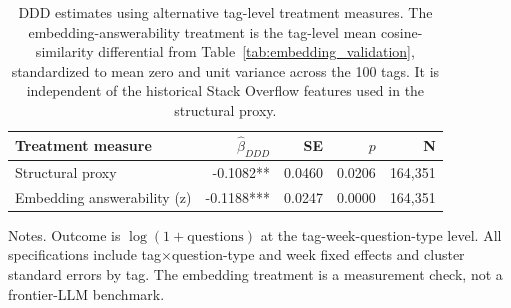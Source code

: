 \begin{table}[ht]
\centering
\caption{DDD estimates using alternative tag-level treatment measures. The embedding-answerability treatment is the tag-level mean cosine-similarity differential from Table~\ref{tab:embedding_validation}, standardized to mean zero and unit variance across the 100 tags. It is independent of the historical Stack Overflow features used in the structural proxy.}
\label{tab:embedding_answerability_treatment}
\small
\begin{tabular}{lrrrr}
\toprule
Treatment measure & $\hat\beta_{DDD}$ & SE & $p$ & N \\
\midrule
Structural proxy & -0.1082** & 0.0460 & 0.0206 & 164,351 \\
Embedding answerability (z) & -0.1188*** & 0.0247 & 0.0000 & 164,351 \\
\bottomrule
\end{tabular}
\begin{minipage}{0.92\textwidth}
\scriptsize Notes. Outcome is $\log(1+\text{questions})$ at the tag-week-question-type level. All specifications include tag$\times$question-type and week fixed effects and cluster standard errors by tag. The embedding treatment is a measurement check, not a frontier-LLM benchmark.
\end{minipage}
\end{table}